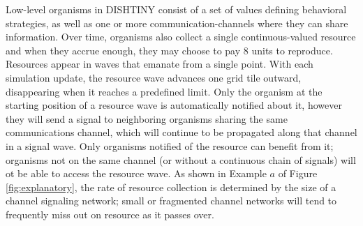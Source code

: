 Low-level organisms in DISHTINY consist of a set of values defining behavioral strategies, as well as one or more communication-channels where they can share information.  Over time, organisms also collect
a single continuous-valued resource and when they accrue enough, they may choose to pay $8$ units to reproduce.
Resources appear in waves that emanate from a single point.
With each simulation update, the resource wave advances one grid tile outward, disappearing when it reaches a predefined limit.
Only the organism at the starting position of a resource wave is automatically notified about it, however they will send a signal to neighboring organisms sharing the same communications channel, which will continue to be propagated along that channel in a signal wave.  Only organisms notified of the resource can benefit from it;
organisms not on the same channel (or without a continuous chain of signals) will ot be able to access the resource wave.
%
As shown in Example $a$ of Figure \ref{fig:explanatory}, the rate of resource collection is determined by the size of a channel signaling network; small or fragmented channel networks will tend to frequently miss out on resource as it passes over.

